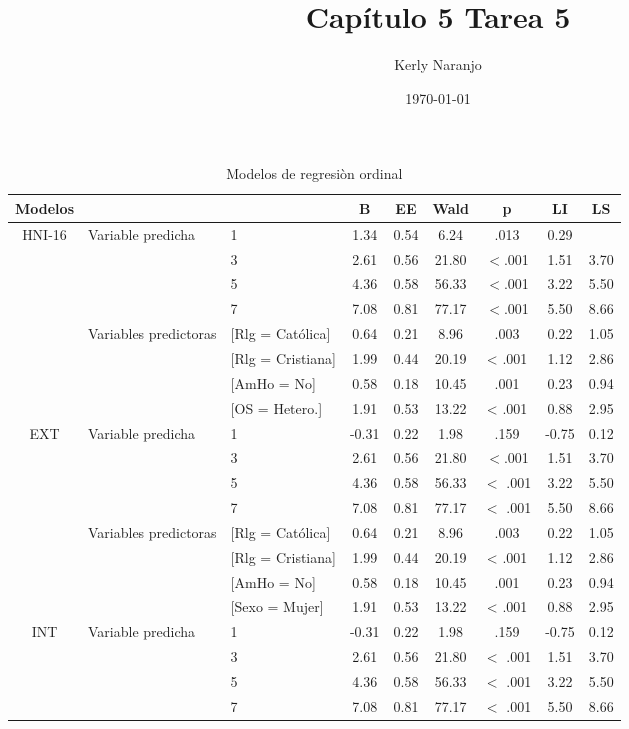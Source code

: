 \documentclass[a4paper, 11pt]{article}
\author{Kerly Naranjo}
\title{Capítulo 5 Tarea 5}
\date{\today}
\begin{document}
\maketitle
\begin{table}[h]
\caption{Modelos de regresiòn ordinal}
\begin{tabular}{c p{} lcccccc} \hline
Modelos & & & B & EE & Wald & p & LI & LS\\ \hline
\multirow{8}{*}{HNI-16} & \multirow{4}{2cm}{Variable predicha}& 1 & 1.34 & 0.54 & 6.24 & .013 & 0.29 \\
& & 3 & 2.61 & 0.56 & 21.80 & \(<\).001 & 1.51 & 3.70 \\
&& 5 & 4.36 & 0.58 & 56.33 & \(<\).001 & 3.22 & 5.50 \\
&& 7 & 7.08 & 0.81 & 77.17 & \(<\).001 & 5.50 & 8.66 \\
& \multirow{4}{2cm}{Variables predictoras} & [Rlg = Católica] & 0.64 & 0.21 & 8.96 & .003 & 0.22 & 1.05 \\
&& [Rlg = Cristiana] & 1.99 & 0.44 & 20.19 & < .001 & 1.12 & 2.86 \\
&& [AmHo = No] & 0.58 & 0.18 & 10.45 & .001 & 0.23 & 0.94 \\
&& [OS = Hetero.] & 1.91 & 0.53 & 13.22 & < .001 & 0.88 & 2.95 \\


\multirow{8}{*}{EXT} & \multirow{4}{2cm}{Variable predicha}& 1 & -0.31 & 0.22 & 1.98 & .159 & -0.75 &0.12 \\
& & 3 & 2.61 & 0.56 & 21.80 & \(<\).001 & 1.51 & 3.70 \\
&& 5 & 4.36 & 0.58 & 56.33 & \(<\) .001 & 3.22 & 5.50 \\
&& 7 & 7.08 & 0.81 & 77.17 & \(<\) .001 & 5.50 & 8.66 \\
& \multirow{4}{2cm}{Variables predictoras} & [Rlg = Católica] & 0.64 & 0.21 & 8.96 & .003 & 0.22 & 1.05 \\
&& [Rlg = Cristiana] & 1.99 & 0.44 & 20.19 & < .001 & 1.12 & 2.86 \\
&& [AmHo = No] & 0.58 & 0.18 & 10.45 & .001 & 0.23 & 0.94 \\
&& [Sexo = Mujer] & 1.91 & 0.53 & 13.22 & < .001 & 0.88 & 2.95 \\


\multirow{8}{*}{INT} & \multirow{4}{2cm}{Variable predicha}& 1 & -0.31 & 0.22 & 1.98 & .159 & -0.75 &0.12 \\
& & 3 & 2.61 & 0.56 & 21.80 & \(<\) .001 & 1.51 & 3.70 \\
&& 5 & 4.36 & 0.58 & 56.33 & \(<\) .001 & 3.22 & 5.50 \\
&& 7 & 7.08 & 0.81 & 77.17 & \(<\) .001 & 5.50 & 8.66 \\


\end{tabular}
\end{table}
\end{document}
